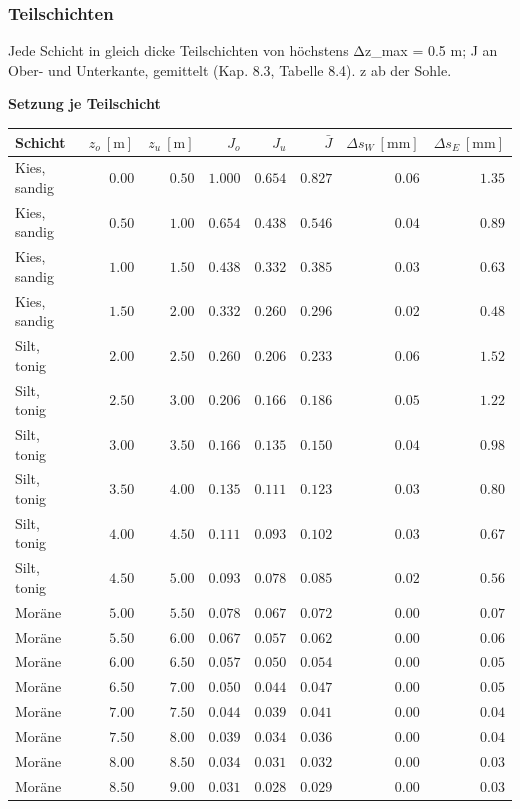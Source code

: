\documentclass[11pt,a4paper]{article}
\begin{document}
\subsubsection{Teilschichten}
Jede Schicht in gleich dicke Teilschichten von höchstens Δz\_max = 0.5 m; J an Ober- und Unterkante, gemittelt (Kap. 8.3, Tabelle 8.4). z ab der Sohle.

\noindent\textbf{Setzung je Teilschicht}
\begin{longtable}{lrrrrrrr}
\hline
Schicht & $z_o\ [\mathrm{m}]$ & $z_u\ [\mathrm{m}]$ & $J_o$ & $J_u$ & $\bar{J}$ & $\Delta s_W\ [\mathrm{mm}]$ & $\Delta s_E\ [\mathrm{mm}]$ \\
\hline
\endhead
Kies, sandig & $0.00$ & $0.50$ & $1.000$ & $0.654$ & $0.827$ & $0.06$ & $1.35$ \\
Kies, sandig & $0.50$ & $1.00$ & $0.654$ & $0.438$ & $0.546$ & $0.04$ & $0.89$ \\
Kies, sandig & $1.00$ & $1.50$ & $0.438$ & $0.332$ & $0.385$ & $0.03$ & $0.63$ \\
Kies, sandig & $1.50$ & $2.00$ & $0.332$ & $0.260$ & $0.296$ & $0.02$ & $0.48$ \\
Silt, tonig & $2.00$ & $2.50$ & $0.260$ & $0.206$ & $0.233$ & $0.06$ & $1.52$ \\
Silt, tonig & $2.50$ & $3.00$ & $0.206$ & $0.166$ & $0.186$ & $0.05$ & $1.22$ \\
Silt, tonig & $3.00$ & $3.50$ & $0.166$ & $0.135$ & $0.150$ & $0.04$ & $0.98$ \\
Silt, tonig & $3.50$ & $4.00$ & $0.135$ & $0.111$ & $0.123$ & $0.03$ & $0.80$ \\
Silt, tonig & $4.00$ & $4.50$ & $0.111$ & $0.093$ & $0.102$ & $0.03$ & $0.67$ \\
Silt, tonig & $4.50$ & $5.00$ & $0.093$ & $0.078$ & $0.085$ & $0.02$ & $0.56$ \\
Moräne & $5.00$ & $5.50$ & $0.078$ & $0.067$ & $0.072$ & $0.00$ & $0.07$ \\
Moräne & $5.50$ & $6.00$ & $0.067$ & $0.057$ & $0.062$ & $0.00$ & $0.06$ \\
Moräne & $6.00$ & $6.50$ & $0.057$ & $0.050$ & $0.054$ & $0.00$ & $0.05$ \\
Moräne & $6.50$ & $7.00$ & $0.050$ & $0.044$ & $0.047$ & $0.00$ & $0.05$ \\
Moräne & $7.00$ & $7.50$ & $0.044$ & $0.039$ & $0.041$ & $0.00$ & $0.04$ \\
Moräne & $7.50$ & $8.00$ & $0.039$ & $0.034$ & $0.036$ & $0.00$ & $0.04$ \\
Moräne & $8.00$ & $8.50$ & $0.034$ & $0.031$ & $0.032$ & $0.00$ & $0.03$ \\
Moräne & $8.50$ & $9.00$ & $0.031$ & $0.028$ & $0.029$ & $0.00$ & $0.03$ \\
\hline
\end{longtable}
\end{document}
